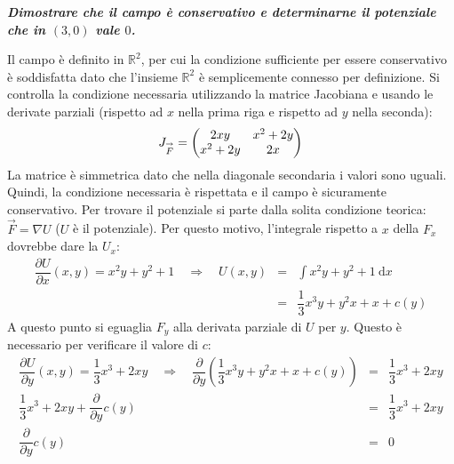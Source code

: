 \documentclass[a4paper]{article}
\makeatletter
\newcommand{\example}[1]{\textcolor{Green4}{\textbf{#1}}}
\newenvironment{rowequmat}[1]{\left(\array{@{}#1@{}}}{\endarray\right)}
\makeatother
\begin{document}
	\noindent
	\example{\emph{Dimostrare che il campo è conservativo e determinarne il potenziale che in $\left(3,0\right)$ vale $0$.}}\newline

	\noindent
	Il campo è definito in $\mathbb{R}^{2}$, per cui la condizione sufficiente per essere conservativo è soddisfatta dato che l'insieme $\mathbb{R}^{2}$ è semplicemente connesso per definizione. Si controlla la condizione necessaria utilizzando la matrice Jacobiana e usando le derivate parziali (rispetto ad $x$ nella prima riga e rispetto ad $y$ nella seconda):
	\begin{equation*}
		J_{\overset{\rightarrow}{F}} = \begin{rowequmat}{c c}
			2xy 		& x^{2} + 2y \\
			x^{2}+2y	& 2x
		\end{rowequmat}
	\end{equation*}
	La matrice è simmetrica dato che nella diagonale secondaria i valori sono uguali. Quindi, la condizione necessaria è rispettata e il campo è sicuramente conservativo. Per trovare il potenziale si parte dalla solita condizione teorica: $\overset{\rightarrow}{F} = \nabla U$ ($U$ è il potenziale). Per questo motivo, l'integrale rispetto a $x$ della $F_{x}$ dovrebbe dare la $U_{x}$:
	\begin{equation*}
		\begin{array}{rcl}
			\dfrac{\partial U}{\partial x}\left(x,y\right) = x^{2}y+y^{2}+1 \hspace{1em} \Rightarrow \hspace{1em} U\left(x,y\right) &=& \displaystyle\int x^{2}y+y^{2}+1 \:\mathrm{d}x \\ [1em]
			&=& \dfrac{1}{3}x^{3}y + y^{2}x + x + c\left(y\right)
		\end{array}
	\end{equation*}
	A questo punto si eguaglia $F_{y}$ alla derivata parziale di $U$ per $y$. Questo è necessario per verificare il valore di $c$:
	\begin{equation*}
		\begin{array}{rcl}
			\dfrac{\partial U}{\partial y}\left(x,y\right) = \dfrac{1}{3}x^{3}+2xy \hspace{1em} \Rightarrow \hspace{1em} \dfrac{\partial}{\partial y}\left(\dfrac{1}{3}x^{3}y + y^{2}x + x + c\left(y\right)\right) &=& \dfrac{1}{3}x^{3}+2xy \\ [1em]
			\dfrac{1}{3}x^{3}+2xy + \dfrac{\partial}{\partial y}c\left(y\right)
			&=&
			\dfrac{1}{3}x^{3}+2xy \\ [1em]
			\dfrac{\partial}{\partial y}c\left(y\right) &=& 0
		\end{array}
	\end{equation*}
\end{document}
